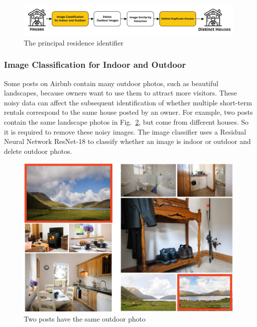\documentclass[conference, compsoc]{IEEEtran}
\begin{document}
\begin{figure}[htbp]
    \centerline{\includegraphics[width=\linewidth]{figures/principal-residence-identifier.jpg}}
    \caption{The principal residence identifier}
    \label{fig:principal-residence-identifier}
\end{figure}

\subsubsection{Image Classification for Indoor and Outdoor}
Some posts on Airbnb contain many outdoor photos, such as beautiful landscapes, because owners want to use them to attract more visitors.
These noisy data can affect the subsequent identification of whether multiple short-term rentals correspond to the same house posted by an owner.
For example, two posts contain the same landscape photos in Fig.~\ref{fig:outdoor-photos}, but come from different houses.
So it is required to remove these noisy images.
The image classifier uses a Residual Neural Network ResNet-18 \cite{resnet18} to classify whether an image is indoor or outdoor and delete outdoor photos.

\begin{figure}[htbp]
    \centerline{\includegraphics[width=\linewidth]{figures/outdoor-photos.jpg}}
    \caption{Two posts have the same outdoor photo}
    \label{fig:outdoor-photos}
\end{figure}
\end{document}
